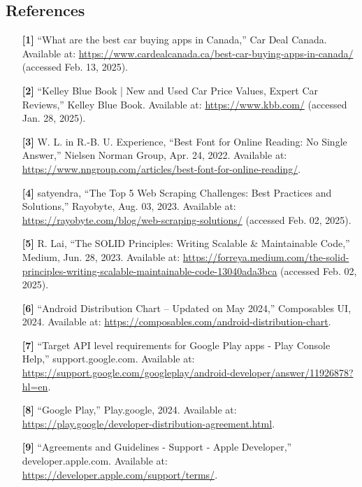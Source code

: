 \documentclass[]{article}
\begin{document}
\subsection{References}
\label{sub:references}
\begin{enumerate}

	\item [\textbf{[1]}] “What are the best car buying apps in Canada,” Car Deal Canada. Available at: \url{https://www.cardealcanada.ca/best-car-buying-apps-in-canada/} (accessed Feb. 13, 2025).

    \item [\textbf{[2]}] “Kelley Blue Book | New and Used Car Price Values, Expert Car Reviews,” Kelley Blue Book. Available at: \url{https://www.kbb.com/} (accessed Jan. 28, 2025).

    \item [\textbf{[3]}] W. L. in R.-B. U. Experience, “Best Font for Online Reading: No Single Answer,” Nielsen Norman Group, Apr. 24, 2022. Available at: \url{https://www.nngroup.com/articles/best-font-for-online-reading/}.
    
    \item [\textbf{[4]}] satyendra, “The Top 5 Web Scraping Challenges: Best Practices and Solutions,” Rayobyte, Aug. 03, 2023. Available at: \url{https://rayobyte.com/blog/web-scraping-solutions/} (accessed Feb. 02, 2025).
    
    \item [\textbf{[5]}] R. Lai, “The SOLID Principles: Writing Scalable \& Maintainable Code,” Medium, Jun. 28, 2023. Available at: \url{https://forreya.medium.com/the-solid-principles-writing-scalable-maintainable-code-13040ada3bca} (accessed Feb. 02, 2025).

    \item [\textbf{[6]}] “Android Distribution Chart – Updated on May 2024,” Composables UI, 2024. Available at: \url{https://composables.com/android-distribution-chart}.

    \item [\textbf{[7]}] “Target API level requirements for Google Play apps - Play Console Help,” support.google.com. Available at: \url{https://support.google.com/googleplay/android-developer/answer/11926878?hl=en}.
    
    \item [\textbf{[8]}] “Google Play,” Play.google, 2024. Available at: \url{https://play.google/developer-distribution-agreement.html}.
    
    \item [\textbf{[9]}] “Agreements and Guidelines - Support - Apple Developer,” developer.apple.com. Available at: \url{https://developer.apple.com/support/terms/}.
    

\end{enumerate}
\end{document}
